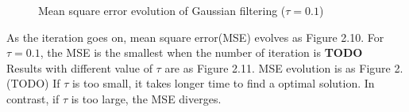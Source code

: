 \documentclass[paper=a4, fontsize=11pt]{scrartcl} %
\numberwithin{equation}{section} %
\numberwithin{figure}{section} %
\numberwithin{table}{section} %
\begin{document}
\begin{figure}[H]
	\centering
	\noindent{}
\caption{Mean square error evolution of Gaussian filtering ($\tau = 0.1$)}
\end{figure}

As the iteration goes on, mean square error(MSE) evolves as Figure 2.10. For $\tau = 0.1$, the MSE is the smallest when the number of iteration is \textbf{TODO} \\ 

Results with different value of $\tau$ are as Figure 2.11. MSE evolution is as Figure 2. (TODO) If $\tau$ is too small, it takes longer time to find a optimal solution. In contrast, if $\tau$ is too large, the MSE diverges. 
\end{document}
